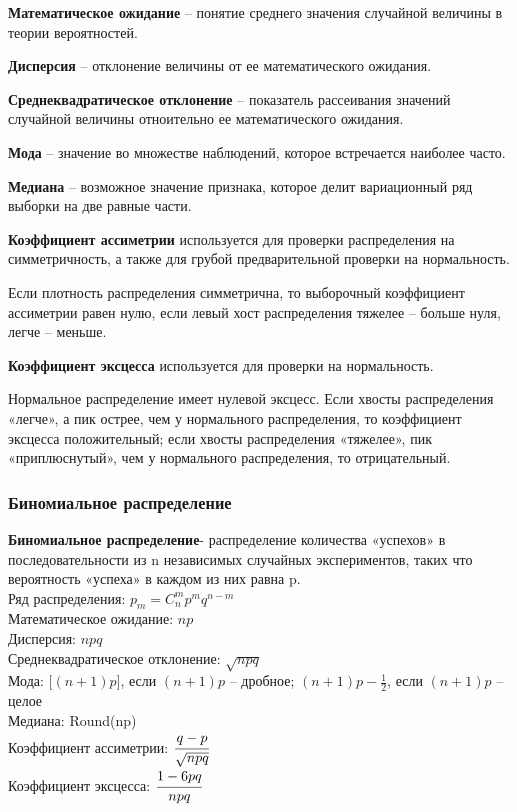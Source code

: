 \textbf{Математическое ожидание} – понятие среднего значения случайной величины в теории вероятностей.

\textbf{Дисперсия} – отклонение величины от ее математического ожидания.

\textbf{Среднеквадратическое отклонение} – показатель рассеивания значений случайной величины отноительно ее математического ожидания.

\textbf{Мода} – значение во множестве наблюдений, которое встречается наиболее часто.

\textbf{Медиана} – возможное значение признака, которое делит вариационный ряд выборки на две равные части.

\textbf{Коэффициент ассиметрии} используется для проверки распределения на симметричность, а также для грубой предварительной проверки на нормальность.

Если плотность распределения симметрична, то выборочный коэффициент ассиметрии равен нулю, если левый хост распределения тяжелее – больше нуля, легче – меньше.


\textbf{Коэффициент эксцесса} используется для проверки на нормальность.

Нормальное распределение имеет нулевой эксцесс. Если хвосты распределения «легче», а пик острее, чем у нормального распределения, то коэффициент эксцесса положительный; если хвосты распределения «тяжелее», пик «приплюснутый», чем у нормального распределения, то отрицательный.


\subsubsection{Биномиальное распределение}

\textbf{Биномиальное распределение}- распределение количества «успехов» в последовательности из n независимых случайных экспериментов, таких что вероятность «успеха» в каждом из них равна p.\\
Ряд распределения: $p_m = C_n^m p^m q^{n−m}$ \\
Математическое ожидание: $np$ \\
Дисперсия: $npq$ \\
Среднеквадратическое отклонение: $\sqrt{npq}$ \\
Мода: $\big[(n+1)p\big]$, если $(n+1)p$ – дробное; 
  $(n+1)p-\frac{1}{2}$, если $(n+1)p$ – целое \\
Медиана:  Round(np) \\ %
Коэффициент ассиметрии: $\cfrac{q-p}{\sqrt{npq}}$\\
Коэффициент эксцесса: $\cfrac{1- 6pq}{npq} $\\

